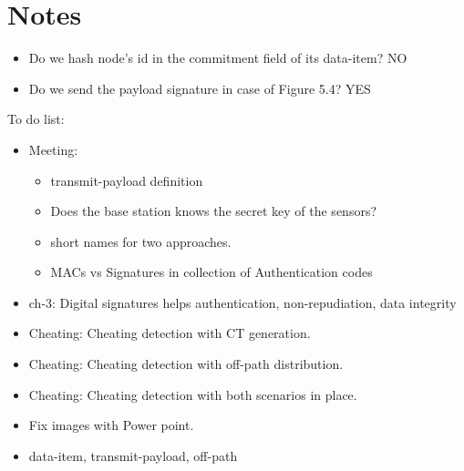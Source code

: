 \chapter{Notes}

\begin{itemize}
	\item Do we hash node's id in the commitment field of its data-item? NO
	\item Do we send the payload signature in case of Figure 5.4? YES
\end{itemize}

To do list:
\begin{itemize}
	\item Meeting: 
	\begin{itemize}
	\item transmit-payload definition
	\item Does the base station knows the secret key of the sensors?
	\item short names for two approaches.
	\item MACs vs Signatures in collection of Authentication codes
	\end{itemize}
	\item ch-3: Digital signatures helps authentication, non-repudiation, data integrity
	\item Cheating: Cheating detection with CT generation.
	\item Cheating: Cheating detection with off-path distribution.
	\item Cheating: Cheating detection with both scenarios in place.
	\item Fix images with Power point.
	\item data-item, transmit-payload, off-path

\end{itemize}
	

